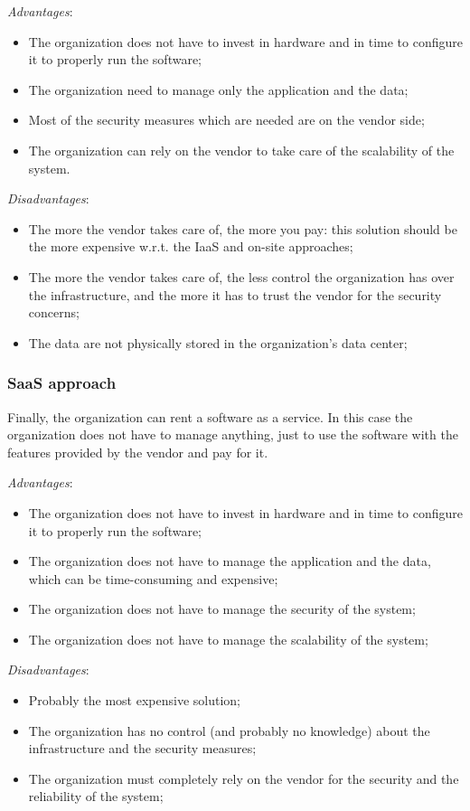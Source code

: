 \textit{Advantages}:
\begin{itemize}
    \itemsep0em
    \item The organization does not have to invest in hardware and in time to configure it to properly run the software;
    \item The organization need to manage only the application and the data;
    \item Most of the security measures which are needed are on the vendor side;
    \item The organization can rely on the vendor to take care of the scalability of the system.
\end{itemize}
\textit{Disadvantages}:
\begin{itemize}
    \itemsep0em
    \item The more the vendor takes care of, the more you pay: this solution should be the more expensive w.r.t. the IaaS and on-site approaches;
    \item The more the vendor takes care of, the less control the organization has over the infrastructure, and the more it has to trust the vendor for the security concerns;
    \item The data are not physically stored in the organization's data center;
\end{itemize}

\subsubsection{SaaS approach}
\label{subsubsec:saas}
Finally, the organization can rent a software as a service. In this case the organization does not have to manage anything, just to use the software with the features provided by the vendor and pay for it.

\textit{Advantages}:
\begin{itemize}
    \itemsep0em
    \item The organization does not have to invest in hardware and in time to configure it to properly run the software;
    \item The organization does not have to manage the application and the data, which can be time-consuming and expensive;
    \item The organization does not have to manage the security of the system;
    \item The organization does not have to manage the scalability of the system;
\end{itemize}
\textit{Disadvantages}:
\begin{itemize}
    \item Probably the most expensive solution;
    \item The organization has no control (and probably no knowledge) about the infrastructure and the security measures;
    \item The organization must completely rely on the vendor for the security and the reliability of the system;
\end{itemize}





